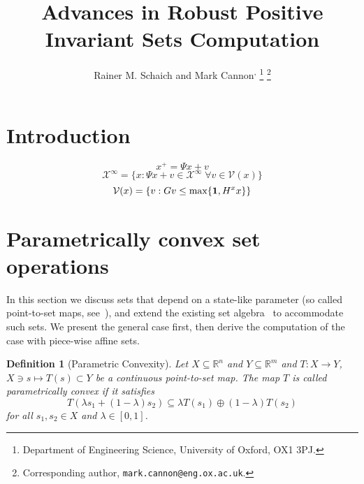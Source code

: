 \documentclass[letterpaper, 10pt, conference]{ieeeconf/ieeeconf} %
\newtheorem{defn}[thm]{Definition}
\begin{document}
  \title{Advances in Robust Positive Invariant Sets Computation}

\author{Rainer M. Schaich\textsuperscript{\dag} %
         and Mark Cannon\textsuperscript{\dag,\ddag}%
\thanks{\textsuperscript{\dag} Department of Engineering Science, University of Oxford, OX1 3PJ.}%
\thanks{\textsuperscript{\ddag} Corresponding author, 
        \texttt{mark.cannon@eng.ox.ac.uk}.}
}


\maketitle

\begin{abstract} 

\end{abstract}

\begin{keywords}
\vskip-\baselineskip
\end{keywords}

\section{Introduction}
\begin{equation}\label{eq:system:equation}
	x^+ = \Psi x + v
\end{equation}
\begin{equation}\label{eq:definition:mrpi:set:state:dependent}
	\mathcal X^\infty = \{x:\Psi x + v\in\mathcal X^\infty\; \forall v\in\mathcal V(x)\}
\end{equation}
\begin{equation}\label{eq:PWA:distrubance:set}
	\mathcal V(x) = \left\{v: Gv\leq\max\{{\bf{1}},H^x x\}\right\}
\end{equation}
\section{Parametrically convex set operations}
In this section we discuss sets that depend on a state-like parameter (so called point-to-set maps, 
see~\cite{Hogan:1973}), and extend the existing set algebra~\cite{blanchini:2007} to 
accommodate such sets. We present the general case first, then derive the computation of
the case with piece-wise affine sets.


    \begin{defn}[Parametric Convexity]\label{def:parametric:convexity}
      Let $X\subseteq\mathbb R^n$ and $Y\subseteq\mathbb R^m$ and $T:X\rightarrow Y$, $X\ni s\mapsto T(s)\subset Y$ be a 
      continuous point-to-set map. The map $T$ is called \emph{parametrically convex} if it satisfies
      \begin{equation}\label{eq:pconvexdef}
        T(\lambda s_1 + (1-\lambda)s_2)\subseteq\lambda T(s_1) \oplus (1-\lambda) T(s_2)
      \end{equation}
      for all $s_1,s_2\in X$ and $\lambda\in[0,1]$.
    \end{defn}
\end{document}
